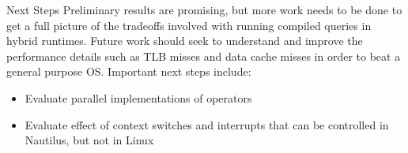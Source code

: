 \begin{block}{Next Steps}
    Preliminary results are promising, but more work needs to be done to get a full picture of the tradeoffs involved with running compiled queries in hybrid runtimes. Future work should seek to understand and improve the performance details such as TLB misses and data cache misses in order to beat a general purpose OS. Important next steps include:

    \begin{itemize}
    \item Evaluate parallel implementations of operators
    \item Evaluate effect of context switches and interrupts that can be controlled in Nautilus, but not in Linux
  \end{itemize}
\end{block}

